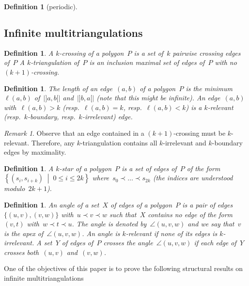 \documentclass{amsart}
\newtheorem{definition}[theorem]{Definition}
\theoremstyle{remark}
\newtheorem{remark}{Remark}[section]
\newcommand{\darkblue}{\color{darkblue}} %
\newcommand{\defn}[1]{\textsl{\darkblue #1}} %
\newcommand*{\ktg}[0]{$k$-triangulation\xspace}
\newcommand{\cl}{\prec}
\newcommand{\set}[2]{\left\{ #1 \;\middle|\; #2 \right\}} %
\begin{document}
\begin{definition}[periodic]

\end{definition}

\subsection{Infinite multitriangulations}

\begin{definition}
A \defn{$k$-crossing} of a polygon~$P$ is a set of~$k$ pairwise crossing edges of~$P$
A \defn{$k$-triangulation} of~$P$ is an inclusion maximal set of edges of~$P$ with no $(k+1)$-crossing.
\end{definition}

\begin{definition}
The \defn{length} of an edge~$(a,b)$ of a polygon~$P$ is the minimum~$\ell(a,b)$ of~$|{]a,b[}|$ and~$|{]b,a[}|$ (note that this might be infinite).
An edge~$(a,b)$ with~$\ell(a,b) > k$ (resp.~$\ell(a,b) = k$, resp.~$\ell(a,b) < k$) is a \defn{$k$-relevant} (resp.~\defn{$k$-boundary}, resp.~\defn{$k$-irrelevant}) edge.
\end{definition}

\begin{remark}
Observe that an edge contained in a $(k+1)$-crossing must be $k$-relevant.
Therefore, any \ktg contains all $k$-irrelevant and $k$-boundary edges by maximality.
\end{remark}


\begin{definition}
A \defn{$k$-star} of a polygon~$P$ is a set of edges of~$P$ of the form~$\set{(s_i, s_{i+k})}{0 \le i \le 2k}$ where~$s_0 \cl \dots \cl s_{2k}$ (the indices are understood modulo~$2k+1$).
\end{definition}

\begin{definition}
An \defn{angle} of a set~$X$ of edges of a polygon~$P$ is a pair of edges~$\{(u,v), (v,w)\}$ with~$u \cl v \cl w$ such that~$X$ contains no edge of the form~$(v,t)$ with~$w \cl t \cl u$. The angle is denoted by~$\angle(u,v,w)$ and we say that~$v$ is the \defn{apex} of~$\angle(u,v,w)$. An angle is \defn{$k$-relevant} if none of its edges is $k$-irrelevant. A set~$Y$ of edges of~$P$ crosses the angle~$\angle(u,v,w)$ if each edge of~$Y$ crosses both~$(u,v)$ and~$(v,w)$.
\end{definition}

One of the objectives of this paper is to prove the following structural results on infinite multitriangulations
\end{document}
